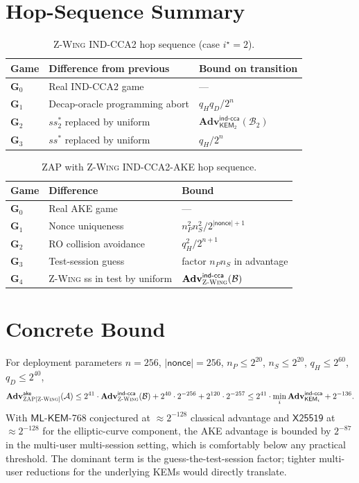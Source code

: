 \documentclass[11pt,a4paper]{article}
\theoremstyle{definition}
\theoremstyle{remark}
\newcommand{\KEM}{\ensuremath{\mathsf{KEM}}}
\newcommand{\Adv}{\ensuremath{\mathbf{Adv}}}
\providecommand{\Game}{}\renewcommand{\Game}{\ensuremath{\mathbf{G}}}
\newcommand{\zwing}{\textsc{Z-Wing}}
\newcommand{\zap}{\textsc{ZAP}}
\newcommand{\mlkem}{\ensuremath{\mathsf{ML\text{-}KEM}}}
\newcommand{\xtf}{\ensuremath{\mathsf{X25519}}}
\begin{document}
\section{Hop-Sequence Summary}\label{sec:summary}

\begin{table}[h]
\centering
\caption{\zwing{} IND-CCA2 hop sequence (case $i^\star = 2$).}
\begin{tabular}{lll}
\hline
Game & Difference from previous & Bound on transition \\
\hline
$\Game_0$ & Real IND-CCA2 game & --- \\
$\Game_1$ & Decap-oracle programming abort & $q_H q_D / 2^n$ \\
$\Game_2$ & $ss_2^*$ replaced by uniform & $\Adv^{\mathsf{ind\text{-}cca}}_{\KEM_2}(\mathcal{B}_2)$ \\
$\Game_3$ & $ss^*$ replaced by uniform & $q_H / 2^n$ \\
\hline
\end{tabular}
\end{table}

\begin{table}[h]
\centering
\caption{\zap{} with \zwing{} IND-CCA2-AKE hop sequence.}
\begin{tabular}{lll}
\hline
Game & Difference & Bound \\
\hline
$\Game_0$ & Real AKE game & --- \\
$\Game_1$ & Nonce uniqueness & $n_P^2 n_S^2 / 2^{|\mathsf{nonce}|+1}$ \\
$\Game_2$ & RO collision avoidance & $q_H^2 / 2^{n+1}$ \\
$\Game_3$ & Test-session guess & factor $n_P n_S$ in advantage \\
$\Game_4$ & \zwing{} ss in test by uniform & $\Adv^{\mathsf{ind\text{-}cca}}_{\zwing}(\mathcal{B})$ \\
\hline
\end{tabular}
\end{table}

\section{Concrete Bound}\label{sec:concrete}

For deployment parameters $n = 256$, $|\mathsf{nonce}| = 256$,
$n_P \le 2^{20}$, $n_S \le 2^{20}$, $q_H \le 2^{60}$, $q_D \le 2^{40}$,
\[
\Adv^{\mathsf{ake}}_{\zap[\zwing]}(\mathcal{A}) \le
2^{41} \cdot \Adv^{\mathsf{ind\text{-}cca}}_{\zwing}(\mathcal{B}) +
2^{40} \cdot 2^{-256} + 2^{120} \cdot 2^{-257}
\le 2^{41} \cdot \min_i \Adv^{\mathsf{ind\text{-}cca}}_{\KEM_i} + 2^{-136}.
\]
With \mlkem{}-768 conjectured at $\approx 2^{-128}$ classical advantage and
\xtf{} at $\approx 2^{-128}$ for the elliptic-curve component, the AKE advantage
is bounded by $2^{-87}$ in the multi-user multi-session setting, which is
comfortably below any practical threshold. The dominant term is the
guess-the-test-session factor; tighter multi-user reductions for the
underlying KEMs would directly translate.
\end{document}
